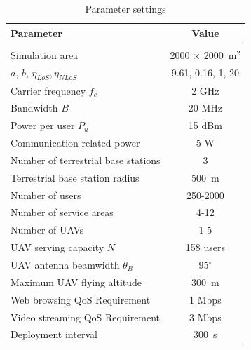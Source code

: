 \documentclass[a4paper,12pt]{report}
\begin{document}
\begin{table} [b!]
    \centering
    \caption{Parameter settings}
    \label{table:Parameter Settings}
    \begin{tabularx}{0.65\linewidth}{l c}
    \toprule
    \textbf{Parameter} & \textbf{Value}\\
    \midrule
    \\ [-2em]
    Simulation area                                     & 2000 $\times$ 2000~m$^2$            \\ [0.5ex]
    $a$, $b$, $\eta _{LoS}, \eta _{NLoS}$ \cite{b8}     & 9.61, 0.16, 1, 20                   \\ [0.5ex]
    Carrier frequency $f_c$                             & 2 GHz                               \\ [0.5ex]
    Bandwidth $B$                                       & 20 MHz                              \\ [0.5ex]
    Power per user $P_u$                                & 15 dBm                              \\ [0.5ex]
    Communication-related power \cite{b22}              & 5 W                                 \\ [0.5ex]
    Number of terrestrial base stations                 & 3                                   \\ [0.5ex]
    Terrestrial base station radius                     & 500~m                               \\ [0.5ex]
    Number of users                                     & 250-2000                            \\ [0.5ex]
    Number of service areas                             & 4-12                                \\ [0.5ex]
    Number of UAVs                                      & 1-5                                 \\ [0.5ex]
    UAV serving capacity $N$                            & 158 users                           \\ [0.5ex]
    UAV antenna beamwidth $\theta_B$ \cite{b14}         & 95$^{\circ}$                        \\ [0.5ex]
    Maximum UAV flying altitude \cite{b23}              & 300~m                               \\ [0.5ex]
    Web browsing QoS Requirement \cite{b26}             & 1 Mbps                              \\ [0.5ex]
    Video streaming QoS Requirement \cite{b26}          & 3 Mbps                              \\ [0.5ex]
    Deployment interval                                 & 300~s                               \\ [0.5ex]
    \bottomrule
    \end{tabularx}
\end{table}
\end{document}
